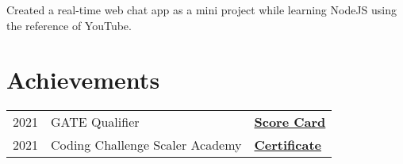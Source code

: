 \documentclass[]{deedy-resume-openfont}
\begin{document}
\begin{minipage}[t]{0.66\textwidth}
Created a real-time web chat app as a mini project while learning NodeJS using the reference of YouTube.
\sectionsep


\section{Achievements} 
\begin{tabular}{rll}
2021	     & GATE Qualifier  & \bf{\href{https://drive.google.com/file/d/15GE8USUrYsOLWMyxbJCKXGUEODwfVKVF/view?usp=sharing}{Score Card}}\\
2021     & Coding Challenge Scaler Academy &  \bf{\href{https://drive.google.com/file/d/1FvnQb3Byb9vj0uEbBudwzwYHRNe2MFp1/view}{Certificate}} \\
\end{tabular}
\sectionsep

\end{minipage} 
\end{document}
